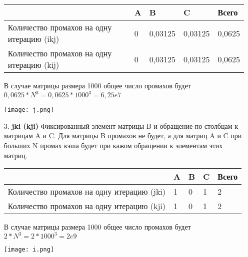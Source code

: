 \documentclass[12pt,a4paper,oneside,final]{article}
\begin{document}
\begin{enumerate}
\begin{table}[h]
\begin{center}
\begin{tabular}{|l|l|l|l|l|}
\hline
                                           & A & B       & C       & Всего  \\ \hline
Количество промахов на одну итерацию (ikj) & 0 & 0,03125 & 0,03125 & 0,0625 \\ \hline
Количество промахов на одну итерацию (kij) & 0 & 0,03125 & 0,03125 & 0,0625 \\ \hline
\end{tabular}
\end{center}
\end{table}

В случае матрицы размера 1000 общее число промахов будет $0,0625  * N^3 = 0,0625 * 1000^3 = 6,25e7$

\begin{center}
\texttt{[image: j.png]}
\label{fig:mpr}
\end{center}

\item[3.]  \textbf{jki (kji)}
Фиксированный элемент матрицы B и обращение по столбцам к матрицам A и C. Для матрицы B промахов не будет, а для матриц A и C при больших N промах кэша будет при кажом обращении к элементам этих матриц. 

\begin{table}[h]
\begin{center}
\begin{tabular}{|l|l|l|l|l|}
\hline
                                           & A & B & C & Всего \\ \hline
Количество промахов на одну итерацию (jki) & 1 & 0 & 1 & 2     \\ \hline
Количество промахов на одну итерацию (kji) & 1 & 0 & 1 & 2     \\ \hline
\end{tabular}
\end{center}
\end{table}

В случае матрицы размера 1000 общее число промахов будет $2  * N^3 = 2 * 1000^3 = 2e9$

\begin{center}
\texttt{[image: i.png]}
\label{fig:mpr}
\end{center}

\end{enumerate}
\end{document}
